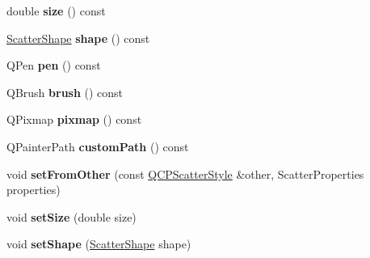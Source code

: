 \begin{DoxyCompactItemize}
\item 
double {\bfseries size} () const \hypertarget{class_q_c_p_scatter_style_a1973ee650368f1c5f55507b78473f634}{}\label{class_q_c_p_scatter_style_a1973ee650368f1c5f55507b78473f634}

\item 
\hyperlink{class_q_c_p_scatter_style_adb31525af6b680e6f1b7472e43859349}{Scatter\+Shape} {\bfseries shape} () const \hypertarget{class_q_c_p_scatter_style_a4462a25ef17769631f4e0aa81dadca4b}{}\label{class_q_c_p_scatter_style_a4462a25ef17769631f4e0aa81dadca4b}

\item 
Q\+Pen {\bfseries pen} () const \hypertarget{class_q_c_p_scatter_style_a3c24c3bf37b561b4807aed9f1418ab58}{}\label{class_q_c_p_scatter_style_a3c24c3bf37b561b4807aed9f1418ab58}

\item 
Q\+Brush {\bfseries brush} () const \hypertarget{class_q_c_p_scatter_style_a46bf481d84bfa31b287dd43a3bf86d37}{}\label{class_q_c_p_scatter_style_a46bf481d84bfa31b287dd43a3bf86d37}

\item 
Q\+Pixmap {\bfseries pixmap} () const \hypertarget{class_q_c_p_scatter_style_a9bab44cc41fcd585621a4b3e0e48231b}{}\label{class_q_c_p_scatter_style_a9bab44cc41fcd585621a4b3e0e48231b}

\item 
Q\+Painter\+Path {\bfseries custom\+Path} () const \hypertarget{class_q_c_p_scatter_style_a4dd4998dfb0d6889205668a06c790328}{}\label{class_q_c_p_scatter_style_a4dd4998dfb0d6889205668a06c790328}

\item 
void {\bfseries set\+From\+Other} (const \hyperlink{class_q_c_p_scatter_style}{Q\+C\+P\+Scatter\+Style} \&other, Scatter\+Properties properties)\hypertarget{class_q_c_p_scatter_style_a7d59ba8864914f765817841089e436f1}{}\label{class_q_c_p_scatter_style_a7d59ba8864914f765817841089e436f1}

\item 
void {\bfseries set\+Size} (double size)\hypertarget{class_q_c_p_scatter_style_aaefdd031052892c4136129db68596e0f}{}\label{class_q_c_p_scatter_style_aaefdd031052892c4136129db68596e0f}

\item 
void {\bfseries set\+Shape} (\hyperlink{class_q_c_p_scatter_style_adb31525af6b680e6f1b7472e43859349}{Scatter\+Shape} shape)\hypertarget{class_q_c_p_scatter_style_a7c641c4d4c6d29cb705d3887cfce91c1}{}\label{class_q_c_p_scatter_style_a7c641c4d4c6d29cb705d3887cfce91c1}


\end{DoxyCompactItemize}
